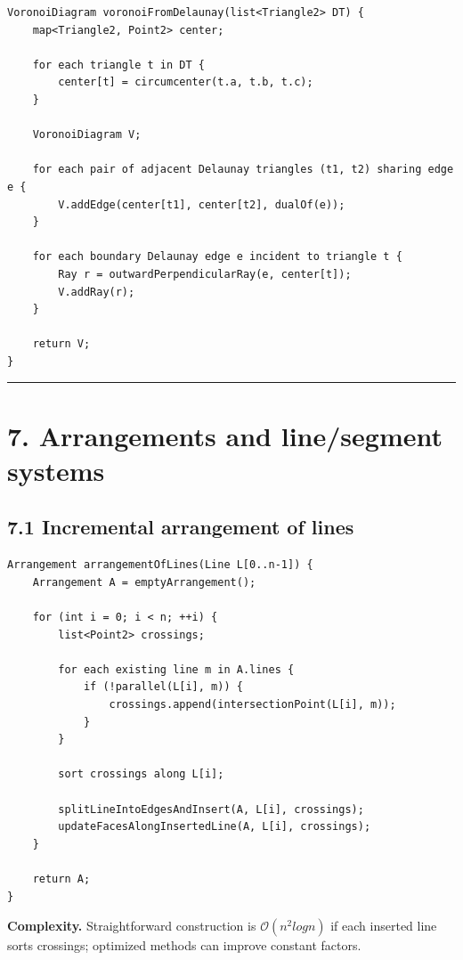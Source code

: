 \documentclass[11pt]{article}
\begin{document}
\begin{verbatim}
VoronoiDiagram voronoiFromDelaunay(list<Triangle2> DT) {
    map<Triangle2, Point2> center;

    for each triangle t in DT {
        center[t] = circumcenter(t.a, t.b, t.c);
    }

    VoronoiDiagram V;

    for each pair of adjacent Delaunay triangles (t1, t2) sharing edge e {
        V.addEdge(center[t1], center[t2], dualOf(e));
    }

    for each boundary Delaunay edge e incident to triangle t {
        Ray r = outwardPerpendicularRay(e, center[t]);
        V.addRay(r);
    }

    return V;
}
\end{verbatim}

\begin{center}\rule{0.5\linewidth}{0.5pt}\end{center}

\section{7. Arrangements and line/segment
systems}\label{arrangements-and-linesegment-systems}

\subsection{7.1 Incremental arrangement of
lines}\label{incremental-arrangement-of-lines}

\begin{verbatim}
Arrangement arrangementOfLines(Line L[0..n-1]) {
    Arrangement A = emptyArrangement();

    for (int i = 0; i < n; ++i) {
        list<Point2> crossings;

        for each existing line m in A.lines {
            if (!parallel(L[i], m)) {
                crossings.append(intersectionPoint(L[i], m));
            }
        }

        sort crossings along L[i];

        splitLineIntoEdgesAndInsert(A, L[i], crossings);
        updateFacesAlongInsertedLine(A, L[i], crossings);
    }

    return A;
}
\end{verbatim}

\textbf{Complexity.} Straightforward construction is
\(\mathcal{O}(n^2 log n)\) if each inserted line sorts
crossings; optimized methods can improve constant factors.
\end{document}
